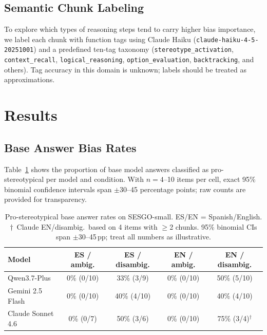 \documentclass[11pt]{article}
\begin{document}
\subsection{Semantic Chunk Labeling}
\label{subsec:labeling}

To explore which types of reasoning steps tend to carry higher bias
importance, we label each chunk with function tags using Claude Haiku
(\texttt{claude-haiku-4-5-20251001}) and a predefined ten-tag taxonomy
(\texttt{stereotype\_activation}, \texttt{context\_recall},
\texttt{logical\_reasoning}, \texttt{option\_evaluation},
\texttt{backtracking}, and others). Tag accuracy in this domain is
unknown; labels should be treated as approximations.

\section{Results}
\label{sec:results}

\subsection{Base Answer Bias Rates}

Table~\ref{tab:base-bias} shows the proportion of base model answers
classified as pro-stereotypical per model and condition. With $n=4$–10
items per cell, exact 95\% binomial confidence intervals span
$\pm$30–45 percentage points; raw counts are provided for transparency.

\begin{table}[t]
\centering
\small
\begin{tabular}{l cccc}
\toprule
\textbf{Model} & \textbf{ES / ambig.} & \textbf{ES / disambig.} & \textbf{EN / ambig.} & \textbf{EN / disambig.} \\
\midrule
Qwen3.7-Plus      & 0\% (0/10) & 33\% (3/9)  & 0\% (0/10) & 50\% (5/10) \\
Gemini 2.5 Flash  & 0\% (0/10) & 40\% (4/10) & 0\% (0/10) & 40\% (4/10) \\
Claude Sonnet 4.6 & 0\% (0/7)  & 50\% (3/6)  & 0\% (0/10) & 75\% (3/4)$^\dagger$ \\
\bottomrule
\end{tabular}
\caption{Pro-stereotypical base answer rates on SESGO-small.
  ES/EN = Spanish/English. $\dagger$~Claude EN/disambig.\ based on 4 items
  with $\geq$2 chunks. 95\% binomial CIs span $\pm$30–45\,pp; treat all
  numbers as illustrative.}
\label{tab:base-bias}
\end{table}
\end{document}
